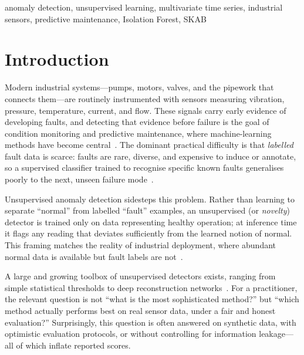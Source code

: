 \documentclass[conference]{IEEEtran}
\begin{document}
\begin{IEEEkeywords}
anomaly detection, unsupervised learning, multivariate time series, industrial
sensors, predictive maintenance, Isolation Forest, SKAB
\end{IEEEkeywords}

\section{Introduction}
Modern industrial systems---pumps, motors, valves, and the pipework that
connects them---are routinely instrumented with sensors measuring vibration,
pressure, temperature, current, and flow. These signals carry early evidence of
developing faults, and detecting that evidence before failure is the goal of
condition monitoring and predictive maintenance, where machine-learning methods
have become central~\cite{rotating2023}. The dominant practical difficulty is
that \emph{labelled} fault data is scarce: faults are rare, diverse, and
expensive to induce or annotate, so a supervised classifier trained to
recognise specific known faults generalises poorly to the next, unseen
failure mode~\cite{chandola2009}.

Unsupervised anomaly detection sidesteps this problem. Rather than learning to
separate ``normal'' from labelled ``fault'' examples, an unsupervised
(or \emph{novelty}) detector is trained only on data representing healthy
operation; at inference time it flags any reading that deviates sufficiently
from the learned notion of normal. This framing matches the reality of
industrial deployment, where abundant normal data is available but fault labels
are not~\cite{belay2023}.

A large and growing toolbox of unsupervised detectors exists, ranging from
simple statistical thresholds to deep reconstruction
networks~\cite{chalapathy2019}. For a practitioner, the relevant question is not
``what is the most sophisticated method?'' but ``which method actually performs
best on real sensor data, under a fair and honest evaluation?'' Surprisingly,
this question is often answered on synthetic data, with optimistic evaluation
protocols, or without controlling for information leakage---all of which inflate
reported scores.
\end{document}
